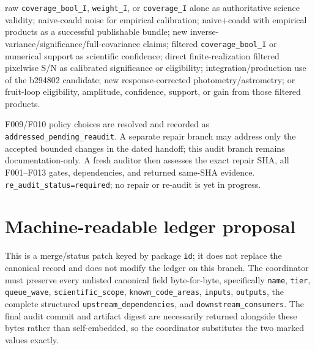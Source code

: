 \documentclass[11pt]{article}
\newcommand{\code}[1]{\nolinkurl{#1}}
\begin{document}
\begin{description}[style=nextline]
raw \code{coverage_bool_I}, \code{weight_I}, or
\code{coverage_I} alone as authoritative science validity; naive-coadd noise
for empirical calibration; naive+coadd with empirical products as a successful
publishable bundle; new inverse-variance/significance/full-covariance claims;
filtered \code{coverage_bool_I} or numerical support as scientific confidence;
direct finite-realization filtered pixelwise S/N as calibrated significance or
eligibility; integration/production use of the b294802 candidate; new response-corrected
photometry/astrometry; or fruit-loop eligibility, amplitude, confidence,
support, or gain from those filtered products.
\item[Repair and re-audit trigger] F009/F010 policy choices are resolved and
recorded as \code{addressed_pending_reaudit}.  A separate repair branch may
address only the accepted bounded changes in the dated handoff; this audit
branch remains documentation-only.  A fresh auditor then assesses the exact
repair SHA, all F001--F013 gates, dependencies, and returned same-SHA evidence.
\code{re_audit_status=required}; no repair or re-audit is yet in progress.
\end{description}

\section{Machine-readable ledger proposal}

This is a merge/status patch keyed by package \code{id}; it does not replace the
canonical record and does not modify the ledger on this branch.  The coordinator
must preserve every unlisted canonical field byte-for-byte, specifically
\code{name}, \code{tier}, \code{queue_wave}, \code{scientific_scope},
\code{known_code_areas}, \code{inputs}, \code{outputs}, the complete structured
\code{upstream_dependencies}, and \code{downstream_consumers}.  The final audit
commit and artifact digest are necessarily returned alongside these bytes rather
than self-embedded, so the coordinator substitutes the two marked values exactly.
\end{document}
